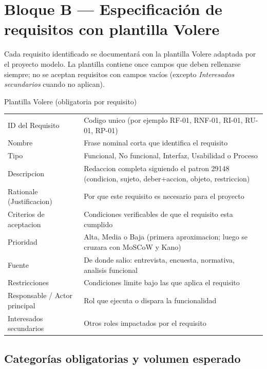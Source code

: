 \documentclass[11pt,a4paper]{article}
\begin{document}
\section{Bloque B --- Especificaci\'on de requisitos con plantilla Volere}

Cada requisito identificado se documentar\'a con la plantilla Volere adaptada por el proyecto modelo. La plantilla contiene once campos que deben rellenarse siempre; no se aceptan requisitos con campos vac\'ios (excepto \emph{Interesados secundarios} cuando no aplican).

\begin{cajaconcepto}{Plantilla Volere (obligatoria por requisito)}
\begin{tabular}{@{}l@{~~$\to$~~}p{9.4cm}@{}}
ID del Requisito & Codigo unico (por ejemplo RF-01, RNF-01, RI-01, RU-01, RP-01)\\
Nombre & Frase nominal corta que identifica el requisito\\
Tipo & Funcional, No funcional, Interfaz, Usabilidad o Proceso\\
Descripcion & Redaccion completa siguiendo el patron 29148 (condicion, sujeto, deber+accion, objeto, restriccion)\\
Rationale (Justificacion) & Por que este requisito es necesario para el proyecto\\
Criterios de aceptacion & Condiciones verificables de que el requisito esta cumplido\\
Prioridad & Alta, Media o Baja (primera aproximacion; luego se cruzara con MoSCoW y Kano)\\
Fuente & De donde salio: entrevista, encuesta, normativa, analisis funcional\\
Restricciones & Condiciones limite bajo las que aplica el requisito\\
Responsable / Actor principal & Rol que ejecuta o dispara la funcionalidad\\
Interesados secundarios & Otros roles impactados por el requisito\\
\end{tabular}
\end{cajaconcepto}

\subsection{Categor\'ias obligatorias y volumen esperado}
\end{document}
